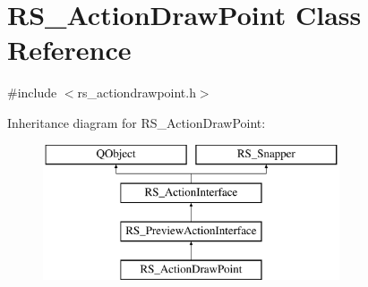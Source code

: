 \hypertarget{classRS__ActionDrawPoint}{\section{R\-S\-\_\-\-Action\-Draw\-Point Class Reference}
\label{classRS__ActionDrawPoint}
}


{\ttfamily \#include $<$rs\-\_\-actiondrawpoint.\-h$>$}

Inheritance diagram for R\-S\-\_\-\-Action\-Draw\-Point\-:\begin{figure}[H]
\begin{center}
\leavevmode
\includegraphics[height=4.000000cm]{classRS__ActionDrawPoint}
\end{center}
\end{figure}
